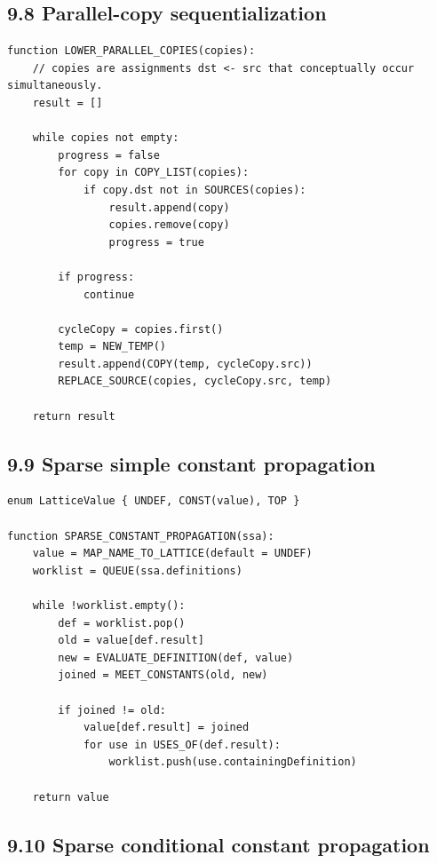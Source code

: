 \documentclass[10pt,letterpaper]{article}
\begin{document}
\subsection*{9.8 Parallel-copy sequentialization}
{}

\begin{verbatim}
function LOWER_PARALLEL_COPIES(copies):
    // copies are assignments dst <- src that conceptually occur simultaneously.
    result = []

    while copies not empty:
        progress = false
        for copy in COPY_LIST(copies):
            if copy.dst not in SOURCES(copies):
                result.append(copy)
                copies.remove(copy)
                progress = true

        if progress:
            continue

        cycleCopy = copies.first()
        temp = NEW_TEMP()
        result.append(COPY(temp, cycleCopy.src))
        REPLACE_SOURCE(copies, cycleCopy.src, temp)

    return result
\end{verbatim}

\subsection*{9.9 Sparse simple constant propagation}
{}

\begin{verbatim}
enum LatticeValue { UNDEF, CONST(value), TOP }

function SPARSE_CONSTANT_PROPAGATION(ssa):
    value = MAP_NAME_TO_LATTICE(default = UNDEF)
    worklist = QUEUE(ssa.definitions)

    while !worklist.empty():
        def = worklist.pop()
        old = value[def.result]
        new = EVALUATE_DEFINITION(def, value)
        joined = MEET_CONSTANTS(old, new)

        if joined != old:
            value[def.result] = joined
            for use in USES_OF(def.result):
                worklist.push(use.containingDefinition)

    return value
\end{verbatim}

\subsection*{9.10 Sparse conditional constant propagation}
{}
\end{document}
